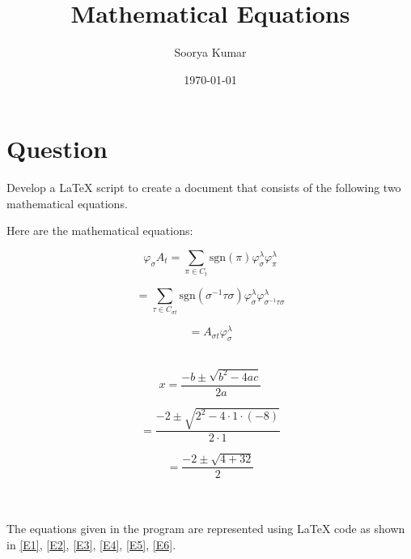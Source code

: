 \documentclass[12pt,a4paper]{article}
\title{Mathematical Equations}
\author{Soorya Kumar}
\date{\today}
\begin{document}
	\maketitle
	\large{
		\section*{Question}
		 Develop a LaTeX script to create a document that consists of the following two mathematical equations.
		
		\noindent Here are the mathematical equations:\\
		
		\begin{minipage}{0.45\textwidth}
			\begin{equation}
				\label{E1}
				\varphi_{\sigma}A_t = \sum_{\pi \in C_t} \text{sgn}(\pi) \varphi_{\sigma}^{\lambda} \varphi_{\pi}^{\lambda}
			\end{equation}
			
			\begin{equation}
				\label{E2}
				= \sum_{\tau \in C_{\sigma t}} \text{sgn}(\sigma^{-1} \tau \sigma) \varphi_{\sigma}^{\lambda} \varphi_{\sigma^{-1} \tau \sigma}^{\lambda}
			\end{equation}
			
			\begin{equation}
				\label{E3}
				 = A_{\sigma t} \varphi_{\sigma}^{\lambda}
			\end{equation}\\
		\end{minipage}
		\hfill
		\begin{minipage}{0.45\textwidth}
			\begin{equation}
				\label{E4}
				 x = \frac{-b \pm \sqrt{b^2 - 4ac}}{2a}
			\end{equation}
			
			\begin{equation}
				\label{E5}
				 = \frac{-2 \pm \sqrt{2^2 - 4 \cdot 1 \cdot (-8)}}{2 \cdot 1}
			\end{equation}
			
			\begin{equation}
				\label{E6}
				 = \frac{-2 \pm \sqrt{4 + 32}}{2}
			\end{equation}\\
		\end{minipage} \\
		
		The equations given in the program are represented using LaTeX code as shown in \ref{E1}, \ref{E2}, \ref{E3}, \ref{E4}, \ref{E5}, \ref{E6}. 
	}
\end{document}

